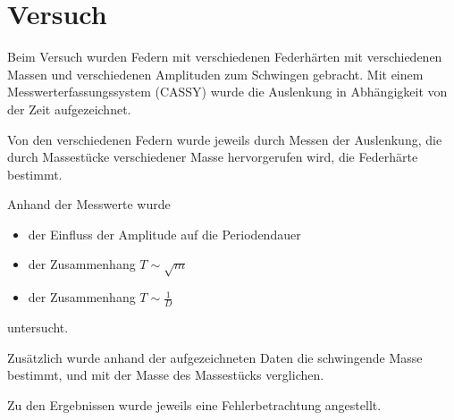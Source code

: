\chapter{Versuch}

Beim Versuch wurden Federn mit verschiedenen Federhärten mit verschiedenen Massen und verschiedenen Amplituden zum Schwingen gebracht. Mit einem Messwerterfassungssystem (CASSY) wurde die Auslenkung in Abhängigkeit von der Zeit aufgezeichnet.

Von den verschiedenen Federn wurde jeweils durch Messen der Auslenkung, die durch Massestücke verschiedener Masse hervorgerufen wird, die Federhärte bestimmt.

Anhand der Messwerte wurde
\begin{itemize}
    \item der Einfluss der Amplitude auf die Periodendauer
    \item der Zusammenhang $T \sim \sqrt{m}$
    \item der Zusammenhang $T \sim \frac{1}{D}$
\end{itemize}
untersucht.

Zusätzlich wurde anhand der aufgezeichneten Daten die schwingende Masse bestimmt, und mit der Masse des Massestücks verglichen.

Zu den Ergebnissen wurde jeweils eine Fehlerbetrachtung angestellt.

